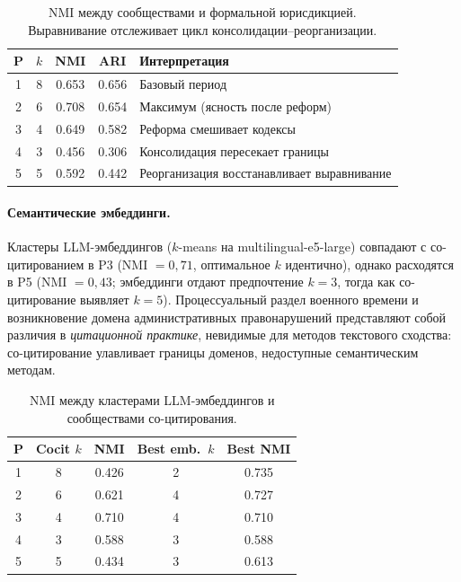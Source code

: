 \documentclass[11pt]{article}
\begin{document}
\begin{table}[t]
\centering
\small
\caption{NMI между сообществами и формальной юрисдикцией. Выравнивание отслеживает цикл консолидации--реорганизации.}
\label{tab:validation}
\begin{tabular}{@{}ccccl@{}}
\toprule
\textbf{P} & $k$ & \textbf{NMI} & \textbf{ARI} & \textbf{Интерпретация} \\
\midrule
1 & 8 & 0.653 & 0.656 & Базовый период \\
2 & 6 & 0.708 & 0.654 & Максимум (ясность после реформ) \\
3 & 4 & 0.649 & 0.582 & Реформа смешивает кодексы \\
4 & 3 & 0.456 & 0.306 & Консолидация пересекает границы \\
5 & 5 & 0.592 & 0.442 & Реорганизация восстанавливает выравнивание \\
\bottomrule
\end{tabular}
\end{table}

\paragraph{Семантические эмбеддинги.}
Кластеры LLM-эмбеддингов ($k$-means на multilingual-e5-large) совпадают с со-цитированием в P3 (NMI $= 0{,}71$, оптимальное $k$ идентично), однако расходятся в P5 (NMI $= 0{,}43$; эмбеддинги отдают предпочтение $k=3$, тогда как со-цитирование выявляет $k=5$).
Процессуальный раздел военного времени и возникновение домена административных правонарушений представляют собой различия в \emph{цитационной практике}, невидимые для методов текстового сходства: со-цитирование улавливает границы доменов, недоступные семантическим методам.

\begin{table}[t]
\centering
\small
\caption{NMI между кластерами LLM-эмбеддингов и сообществами со-цитирования.}
\label{tab:embeddings}
\begin{tabular}{@{}ccccc@{}}
\toprule
\textbf{P} & \textbf{Cocit $k$} & \textbf{NMI} & \textbf{Best emb.\ $k$} & \textbf{Best NMI} \\
\midrule
1 & 8 & 0.426 & 2 & 0.735 \\
2 & 6 & 0.621 & 4 & 0.727 \\
3 & 4 & 0.710 & 4 & 0.710 \\
4 & 3 & 0.588 & 3 & 0.588 \\
5 & 5 & 0.434 & 3 & 0.613 \\
\bottomrule
\end{tabular}
\end{table}
\end{document}
